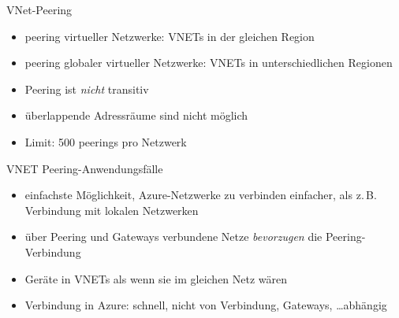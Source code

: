 

\begin{flashcard}[Definition]{VNet-Peering}
    \begin{itemize}
        \item peering virtueller Netzwerke: VNETs in der gleichen Region
        \item peering globaler virtueller Netzwerke: VNETs in unterschiedlichen Regionen
        \item Peering ist \emph{nicht} transitiv
        \item überlappende Adressräume sind nicht möglich
        \item Limit: 500 peerings pro Netzwerk
    \end{itemize}
\end{flashcard}

\begin{flashcard}[Definition]{VNET Peering-Anwendungsfälle}
    \begin{itemize}
        \item einfachste Möglichkeit, Azure-Netzwerke zu verbinden\newline
            einfacher, als z.\,B. Verbindung mit lokalen Netzwerken
        \item über Peering und Gateways verbundene Netze \emph{bevorzugen} die Peering-Verbindung
        \item Geräte in VNETs als wenn sie im gleichen Netz wären
        \item Verbindung in Azure: schnell, nicht von Verbindung, Gateways, \ldots abhängig
    \end{itemize}
\end{flashcard}

